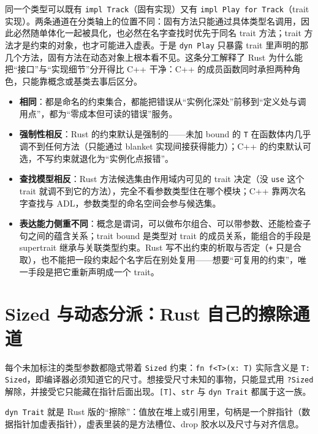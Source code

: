 \documentclass[12pt,a4paper,fontset=fandol]{ctexbook}
\newcommand{\cpp}[1]{C++#1}
\newcommand{\kw}[1]{\texttt{#1}}
\begin{document}
\begin{stdbox}[title={固有实现与 trait 实现的分工}]
  同一个类型可以既有 \kw{impl Track}（固有实现）又有 \kw{impl Play for Track}（trait 实现）。两条通道在分类轴上的位置不同：固有方法只能通过具体类型名调用，因此必然随单体化一起被具化，也必然在名字查找时优先于同名 trait 方法；trait 方法才是约束的对象，也才可能进入虚表。于是 \kw{dyn Play} 只暴露 trait 里声明的那几个方法，固有方法在动态对象上根本看不见。这条分工解释了 Rust 为什么能把“接口”与“实现细节”分开得比 \cpp{} 干净：\cpp{} 的成员函数同时承担两种角色，只能靠概念或基类去事后区分。
\end{stdbox}

\begin{compare}[title={Rust trait bound 与 \cpp{20} 概念：同位不同性}]
  \begin{itemize}
    \item \textbf{相同}：都是命名的约束集合，都能把错误从“实例化深处”前移到“定义处与调用点”，都为“零成本但可读的错误”服务。
    \item \textbf{强制性相反}：Rust 的约束默认是强制的——未加 bound 的 \kw{T} 在函数体内几乎调不到任何方法（只能通过 blanket 实现间接获得能力）；\cpp{} 的约束默认可选，不写约束就退化为“实例化点报错”。
    \item \textbf{查找模型相反}：Rust 方法候选集由作用域内可见的 trait 决定（没 \kw{use} 这个 trait 就调不到它的方法），完全不看参数类型住在哪个模块；\cpp{} 靠两次名字查找与 ADL，参数类型的命名空间会参与候选集。
    \item \textbf{表达能力侧重不同}：概念是谓词，可以做布尔组合、可以带参数、还能检查子句之间的蕴含关系；trait bound 是类型对 trait 的成员关系，能组合的手段是 supertrait 继承与关联类型约束。Rust 写不出约束的析取与否定（\kw{+} 只是合取），也不能把一段约束起个名字后在别处复用——想要“可复用的约束”，唯一手段是把它重新声明成一个 trait。
  \end{itemize}
\end{compare}

\section{Sized 与动态分派：Rust 自己的擦除通道}

每个未加标注的类型参数都隐式带着 \kw{Sized} 约束：\kw{fn f<T>(x: T)} 实际含义是 \kw{T: Sized}，即编译器必须知道它的尺寸。想接受尺寸未知的事物，只能显式用 \kw{?Sized} 解除，并接受它只能藏在指针后面出现。\kw{[T]}、\kw{str} 与 \kw{dyn Trait} 都属于这一族。

\kw{dyn Trait} 就是 Rust 版的“擦除”：值放在堆上或引用里，句柄是一个胖指针（数据指针加虚表指针），虚表里装的是方法槽位、drop 胶水以及尺寸与对齐信息。
\end{document}
